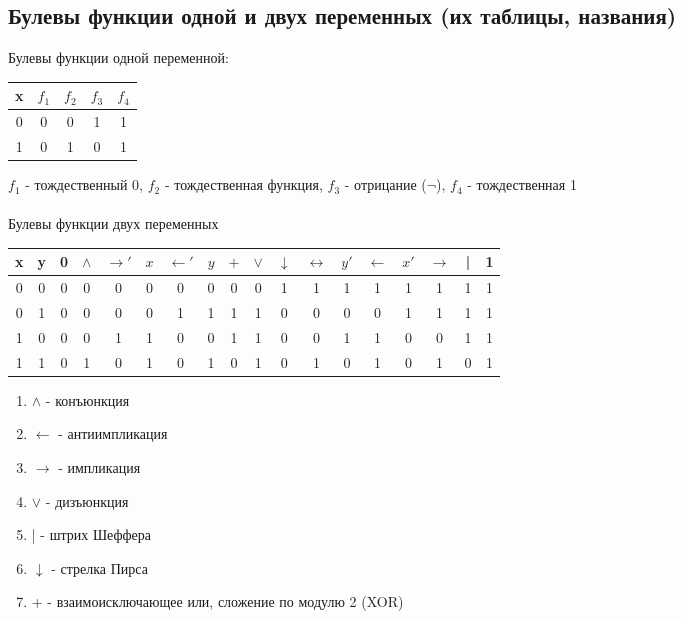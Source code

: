 \documentclass[a4paper]{article}
\theoremstyle{definition}
\theoremstyle{remark}
\begin{document}
    \subsection{Булевы функции одной и двух переменных (их таблицы, названия)}
        Булевы функции одной переменной:
         \begin{tabular}{c|cccc}
        x & $f_1$ & $f_2$ & $f_3$ & $f_4$ \\
        \hline
        0 & 0 & 0 & 1 & 1 \\
        1 & 0 & 1 & 0 & 1 \\ 
        \end{tabular}
    $f_1$ - тождественный 0, $f_2$ - тождественная функция, $f_3$ - отрицание ($\neg$), $f_4$ - тождественная 1
\\ \\
    Булевы функции двух переменных
    \begin{tabular}{cc|cccccccccccccccc}
        x & y & 0 & $\wedge$ & $\rightarrow '$ & $x$ & $\leftarrow '$ & $y$ & $+$ & $\vee$ & $\downarrow$ & $\leftrightarrow$ & $y'$ & $\leftarrow$ & $x'$ & $\rightarrow$ & | & 1\\
        \hline
        0 & 0 & 0 & 0 & 0 & 0 & 0 & 0 & 0 & 0 & 1 & 1 & 1 & 1 & 1 & 1 & 1 & 1 \\
        0 & 1 & 0 & 0 & 0 & 0 & 1 & 1 & 1 & 1 & 0 & 0 & 0 & 0 & 1 & 1 & 1 & 1 \\ 
        1 & 0 & 0 & 0 & 1 & 1 & 0 & 0 & 1 & 1 & 0 & 0 & 1 & 1 & 0 & 0 & 1 & 1 \\
        1 & 1 & 0 & 1 & 0 & 1 & 0 & 1 & 0 & 1 & 0 & 1 & 0 & 1 & 0 & 1 & 0 & 1 \\
        \end{tabular}
    \begin{enumerate}
        \item $\wedge$ - конъюнкция
        \item $\leftarrow$ -  антиимпликация
        \item $\rightarrow$ - импликация
        \item $\vee$ - дизъюнкция
        \item | - штрих Шеффера
        \item $\downarrow$ - стрелка Пирса
        \item + -  взаимоисключающее или, сложение по модулю 2 (XOR)
    \end{enumerate}
\end{document}
